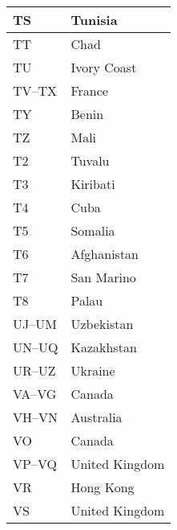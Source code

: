 \begin{longtable}{|l|l|}
  \hline
  TS                  & Tunisia                                   \\
  \hline
  TT                  & Chad                                      \\
  \hline
  TU                  & Ivory Coast                               \\
  \hline
  TV--TX              & France                                    \\
  \hline
  TY                  & Benin                                     \\
  \hline
  TZ                  & Mali                                      \\
  \hline
  T2                  & Tuvalu                                    \\
  \hline
  T3                  & Kiribati                                  \\
  \hline
  T4                  & Cuba                                      \\
  \hline
  T5                  & Somalia                                   \\
  \hline
  T6                  & Afghanistan                               \\
  \hline
  T7                  & San Marino                                \\
  \hline
  T8                  & Palau                                     \\
  \hline
  UJ--UM              & Uzbekistan                                \\
  \hline
  UN--UQ              & Kazakhstan                                \\
  \hline
  UR--UZ              & Ukraine                                   \\
  \hline
  VA--VG              & Canada                                    \\
  \hline
  VH--VN              & Australia                                 \\
  \hline
  VO                  & Canada                                    \\
  \hline
  VP--VQ              & United Kingdom                            \\
  \hline
  VR                  & Hong Kong                                 \\
  \hline
  VS                  & United Kingdom                            \\
  \hline

\end{longtable}
